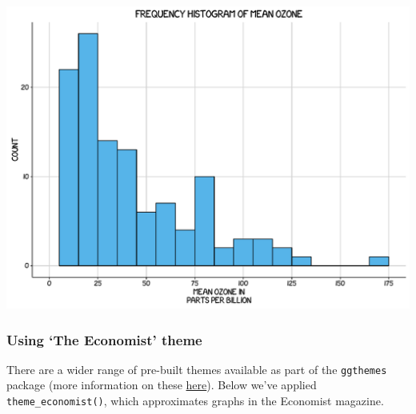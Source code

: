 \documentclass[]{article}
\begin{document}
\begin{center}\includegraphics{0_all_posts_pdf/histogram_14-1} \end{center}

\subsubsection{\texorpdfstring{Using `The Economist'
theme}{Using The Economist theme}}\label{using-the-economist-theme-6}

There are a wider range of pre-built themes available as part of the
\texttt{ggthemes} package (more information on these
\href{https://cran.r-project.org/web/packages/ggthemes/vignettes/ggthemes.html}{here}).
Below we've applied \texttt{theme\_economist()}, which approximates
graphs in the Economist magazine.
\end{document}
